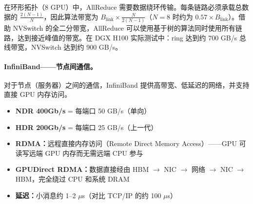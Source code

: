\begin{intuitionbox}[环形拓扑 vs. 全二分]
在环形拓扑（8 GPU）中，AllReduce 需要数据绕环传输。每条链路必须承载总数据的 $\frac{2(N-1)}{N}$，因此算法带宽为 $B_{\text{link}} \times \frac{N}{2(N-1)}$（$N=8$ 时约为 $0.57 \times B_{\text{link}}$）。借助 NVSwitch 的全二分带宽，AllReduce 可以使用基于树的算法同时使用所有链路，达到接近峰值的带宽。在 DGX H100 实际测试中：ring 达到约 700 GB/s 总线带宽，NVSwitch 达到约 900 GB/s。
\end{intuitionbox}

\paragraph{InfiniBand——节点间通信。}
\label{infiniband-inter-node-communication.}

对于节点（服务器）之间的通信，InfiniBand 提供高带宽、低延迟的网络，并支持直接 GPU 内存访问。

\begin{keybox}
\begin{itemize}
  \item \textbf{NDR 400Gb/s} = 每端口 50 GB/s（单向）
  \item \textbf{HDR 200Gb/s} = 每端口 25 GB/s（上一代）
  \item \textbf{RDMA：}远程直接内存访问（Remote Direct Memory Access）——GPU 可读写远端 GPU 内存而无需远端 CPU 参与
  \item \textbf{GPUDirect RDMA：}数据直接经由 HBM $\to$ NIC $\to$ 网络 $\to$ NIC $\to$ HBM，完全绕过 CPU 和系统 DRAM
  \item \textbf{延迟：}小消息约 1--2 $\mu$s（对比 TCP/IP 的约 100 $\mu$s）
\end{itemize}
\end{keybox}

